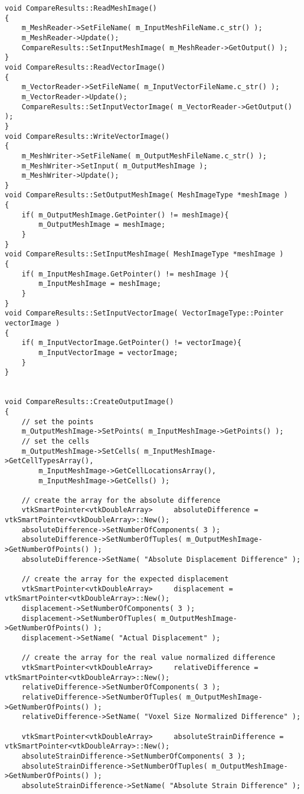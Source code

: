 \begin{lstlisting}
void CompareResults::ReadMeshImage()
{
	m_MeshReader->SetFileName( m_InputMeshFileName.c_str() );
	m_MeshReader->Update();
	CompareResults::SetInputMeshImage( m_MeshReader->GetOutput() );
}
void CompareResults::ReadVectorImage()
{
	m_VectorReader->SetFileName( m_InputVectorFileName.c_str() );
	m_VectorReader->Update();
	CompareResults::SetInputVectorImage( m_VectorReader->GetOutput() );	
}
void CompareResults::WriteVectorImage()
{
	m_MeshWriter->SetFileName( m_OutputMeshFileName.c_str() );
	m_MeshWriter->SetInput( m_OutputMeshImage );
	m_MeshWriter->Update();	
}
void CompareResults::SetOutputMeshImage( MeshImageType *meshImage )
{
	if( m_OutputMeshImage.GetPointer() != meshImage){
		m_OutputMeshImage = meshImage;
	}
}
void CompareResults::SetInputMeshImage( MeshImageType *meshImage )
{
	if( m_InputMeshImage.GetPointer() != meshImage ){
		m_InputMeshImage = meshImage;
	}
}
void CompareResults::SetInputVectorImage( VectorImageType::Pointer vectorImage )
{
	if( m_InputVectorImage.GetPointer() != vectorImage){
		m_InputVectorImage = vectorImage;
	}
}


void CompareResults::CreateOutputImage()
{
	// set the points
	m_OutputMeshImage->SetPoints( m_InputMeshImage->GetPoints() );
	// set the cells
	m_OutputMeshImage->SetCells( m_InputMeshImage->GetCellTypesArray(),
		m_InputMeshImage->GetCellLocationsArray(),
		m_InputMeshImage->GetCells() );

	// create the array for the absolute difference
	vtkSmartPointer<vtkDoubleArray>		absoluteDifference = vtkSmartPointer<vtkDoubleArray>::New();
	absoluteDifference->SetNumberOfComponents( 3 );	
	absoluteDifference->SetNumberOfTuples( m_OutputMeshImage->GetNumberOfPoints() );
	absoluteDifference->SetName( "Absolute Displacement Difference" );

	// create the array for the expected displacement
	vtkSmartPointer<vtkDoubleArray>		displacement = vtkSmartPointer<vtkDoubleArray>::New();
	displacement->SetNumberOfComponents( 3 );	
	displacement->SetNumberOfTuples( m_OutputMeshImage->GetNumberOfPoints() );
	displacement->SetName( "Actual Displacement" );
	
	// create the array for the real value normalized difference
	vtkSmartPointer<vtkDoubleArray>		relativeDifference = vtkSmartPointer<vtkDoubleArray>::New();
	relativeDifference->SetNumberOfComponents( 3 );	
	relativeDifference->SetNumberOfTuples( m_OutputMeshImage->GetNumberOfPoints() );
	relativeDifference->SetName( "Voxel Size Normalized Difference" );
	
	vtkSmartPointer<vtkDoubleArray>		absoluteStrainDifference = vtkSmartPointer<vtkDoubleArray>::New();
	absoluteStrainDifference->SetNumberOfComponents( 3 );
	absoluteStrainDifference->SetNumberOfTuples( m_OutputMeshImage->GetNumberOfPoints() );
	absoluteStrainDifference->SetName( "Absolute Strain Difference" );
	

\end{lstlisting}
